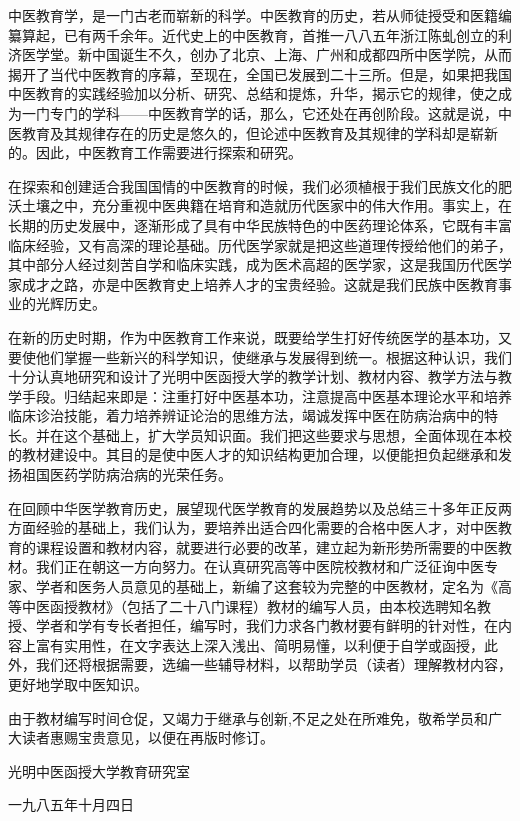 \documentclass[a4paper,12pt,UTF8,twoside]{ctexbook}
\begin{document}
中医教育学，是一门古老而崭新的科学。中医教育的历史，若从师徒授受和医籍编纂算起，已有两千余年。近代史上的中医教育，首推一八八五年浙江陈虬创立的利济医学堂。新中国诞生不久，创办了北京、上海、广州和成都四所中医学院，从而揭开了当代中医教育的序幕，至现在，全国已发展到二十三所。但是，如果把我国中医教育的实践经验加以分析、研究、总结和提炼，升华，揭示它的规律，使之成为一门专门的学科——中医教育学的话，那么，它还处在再创阶段。这就是说，中医教育及其规律存在的历史是悠久的，但论述中医教育及其规律的学科却是崭新的。因此，中医教育工作需要进行探索和研究。

在探索和创建适合我国国情的中医教育的时候，我们必须植根于我们民族文化的肥沃土壤之中，充分重视中医典籍在培育和造就历代医家中的伟大作用。事实上，在长期的历史发展中，逐渐形成了具有中华民族特色的中医药理论体系，它既有丰富临床经验，又有高深的理论基础。历代医学家就是把这些道理传授给他们的弟子，其中部分人经过刻苦自学和临床实践，成为医术高超的医学家，这是我国历代医学家成才之路，亦是中医教育史上培养人才的宝贵经验。这就是我们民族中医教育事业的光辉历史。

在新的历史时期，作为中医教育工作来说，既要给学生打好传统医学的基本功，又要使他们掌握一些新兴的科学知识，使继承与发展得到统一。根据这种认识，我们十分认真地研究和设计了光明中医函授大学的教学计划、教材内容、教学方法与教学手段。归结起来即是：注重打好中医基本功，注意提高中医基本理论水平和培养临床诊治技能，着力培养辨证论治的思维方法，竭诚发挥中医在防病治病中的特长。并在这个基础上，扩大学员知识面。我们把这些要求与思想，全面体现在本校的教材建设中。其目的是使中医人才的知识结构更加合理，以便能担负起继承和发扬祖国医药学防病治病的光荣任务。

在回顾中华医学教育历史，展望现代医学教育的发展趋势以及总结三十多年正反两方面经验的基础上，我们认为，要培养出适合四化需要的合格中医人才，对中医教育的课程设置和教材内容，就要进行必要的改革，建立起为新形势所需要的中医教材。我们正在朝这一方向努力。在认真研究高等中医院校教材和广泛征询中医专家、学者和医务人员意见的基础上，新编了这套较为完整的中医教材，定名为《高等中医函授教材》（包括了二十八门课程）教材的编写人员，由本校选聘知名教授、学者和学有专长者担任，编写时，我们力求各门教材要有鲜明的针对性，在内容上富有实用性，在文字表达上深入浅出、简明易懂，以利便于自学或函授，此外，我们还将根据需要，选编一些辅导材料，以帮助学员（读者）理解教材内容，更好地学取中医知识。

由于教材编写时间仓促，又竭力于继承与创新,不足之处在所难免，敬希学员和广大读者惠赐宝贵意见，以便在再版时修订。

光明中医函授大学教育研究室

一九八五年十月四日
\end{document}
